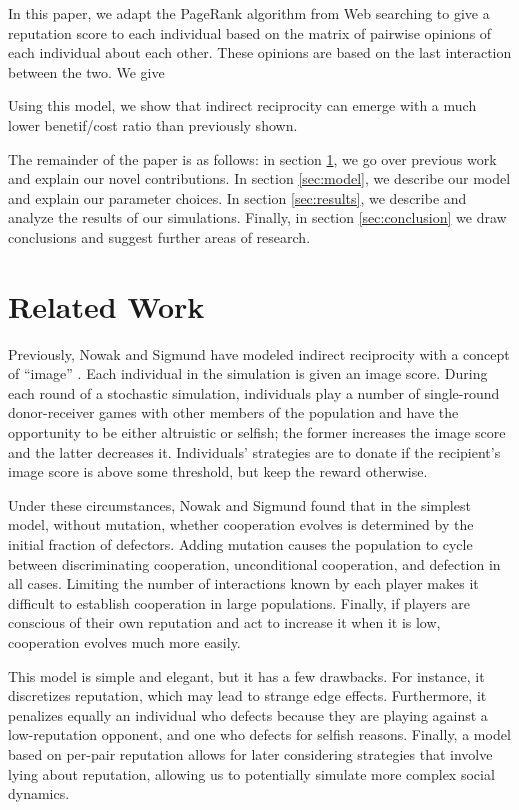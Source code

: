 \documentclass{amsart}
\begin{document}
In this paper, we adapt the PageRank algorithm from Web searching to give a reputation score to each individual based on the matrix of pairwise opinions of each individual about each other. These opinions are based on the last interaction between the two. We give %

Using this model, we show that indirect reciprocity can emerge with a much lower benetif/cost ratio than previously shown. %

The remainder of the paper is as follows: in section \ref{sec:related}, we go over previous work and explain our novel contributions. In section \ref{sec:model}, we describe our model and explain our parameter choices. In section \ref{sec:results}, we describe and analyze the results of our simulations. Finally, in section \ref{sec:conclusion} we draw conclusions and suggest further areas of research.

\section{Related Work}\label{sec:related}

Previously, Nowak and Sigmund have modeled indirect reciprocity with a concept of ``image'' \cite{nowak_evolution_1998}. Each individual in the simulation is given an image score. During each round of a stochastic simulation, individuals play a number of single-round donor-receiver games with other members of the population and have the opportunity to be either altruistic or selfish; the former increases the image score and the latter decreases it. Individuals’ strategies are to donate if the recipient’s image score is above some threshold, but keep the reward otherwise.

Under these circumstances, Nowak and Sigmund found that in the simplest model, without mutation, whether cooperation evolves is determined by the initial fraction of defectors. Adding mutation causes the population to cycle between discriminating cooperation, unconditional cooperation, and defection in all cases. Limiting the number of interactions known by each player makes it difficult to establish cooperation in large populations. Finally, if players are conscious of their own reputation and act to increase it when it is low, cooperation evolves much more easily. 

This model is simple and elegant, but it has a few drawbacks. For instance, it discretizes reputation, which may lead to strange edge effects. Furthermore, it penalizes equally an individual who defects because they are playing against a low-reputation opponent, and one who defects for selfish reasons. Finally, a model based on per-pair reputation allows for later considering strategies that involve lying about reputation, allowing us to potentially simulate more complex social dynamics.
\end{document}
